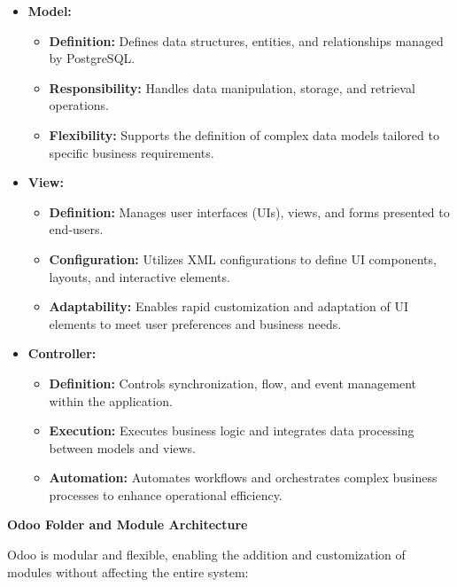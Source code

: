 \begin{itemize}
\item \textbf{Model:}
  \begin{itemize}
  \item \textbf{Definition:} Defines data structures, entities, and relationships managed by PostgreSQL.
  \item \textbf{Responsibility:} Handles data manipulation, storage, and retrieval operations.
  \item \textbf{Flexibility:} Supports the definition of complex data models tailored to specific business requirements.
  \end{itemize}
  
\item \textbf{View:}
  \begin{itemize}
  \item \textbf{Definition:} Manages user interfaces (UIs), views, and forms presented to end-users.
  \item \textbf{Configuration:} Utilizes XML configurations to define UI components, layouts, and interactive elements.
  \item \textbf{Adaptability:} Enables rapid customization and adaptation of UI elements to meet user preferences and business needs.
  \end{itemize}
  
\item \textbf{Controller:}
  \begin{itemize}
  \item \textbf{Definition:} Controls synchronization, flow, and event management within the application.
  \item \textbf{Execution:} Executes business logic and integrates data processing between models and views.
  \item \textbf{Automation:} Automates workflows and orchestrates complex business processes to enhance operational efficiency.
  \end{itemize}
\end{itemize}

\textbf{Odoo Folder and Module Architecture}

Odoo is modular and flexible, enabling the addition and customization of modules without affecting the entire system:

